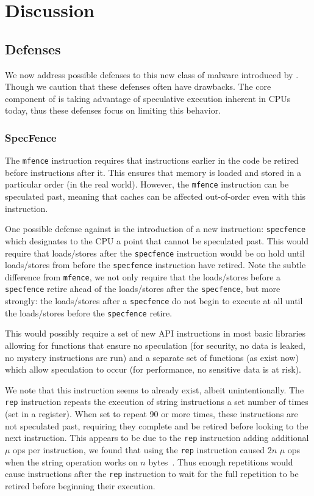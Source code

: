
\section{Discussion}

\subsection{Defenses}
We now address possible defenses to this new class of malware introduced by
\speculake. Though we caution that these defenses often have drawbacks. The core
component of \speculake is taking advantage of speculative execution inherent in
CPUs today, thus these defenses focus on limiting this behavior.


\subsubsection{SpecFence}
The \texttt{mfence} instruction requires that instructions earlier in the code
be retired before instructions after it. This ensures that memory is loaded and
stored in a particular order (in the real world). However, the \texttt{mfence}
instruction can be speculated past, meaning that caches can be affected
out-of-order even with this instruction.

One possible defense against \speculake is the introduction of a new
instruction: \texttt{specfence} which designates to the CPU a point that cannot 
be speculated past. This would require that loads/stores after the 
\texttt{specfence} instruction would be on hold until loads/stores from before
the \texttt{specfence} instruction have retired. Note the subtle difference from
\texttt{mfence}, we not only require that the loads/stores before a
\texttt{specfence} retire ahead of the loads/stores after the 
\texttt{specfence}, but more strongly: the loads/stores after a 
\texttt{specfence} do not begin to execute at all until the loads/stores before
the \texttt{specfence} retire.

This would possibly require a set of new API instructions in most basic
libraries allowing for functions that ensure no speculation (for security, no
data is leaked, no mystery instructions are run) and a separate set of functions
(as exist now) which allow speculation to occur (for performance, no sensitive
data is at risk).

We note that this instruction seems to already exist, albeit unintentionally.
The \texttt{rep} instruction repeats the execution of string instructions a set
number of times (set in a register). When set to repeat 90 or more times, these
instructions are not speculated past, requiring they complete and be retired
before looking to the next instruction. This appears to be due to the 
\texttt{rep} instruction adding additional $\mu$ ops per instruction, we found
that using the \texttt{rep} instruction caused $2n$ $\mu$ ops when the string
operation works on $n$ bytes~\cite{uop_article}. Thus enough repetitions would cause instructions
after the \texttt{rep} instruction to wait for the full repetition to be retired
before beginning their execution.

